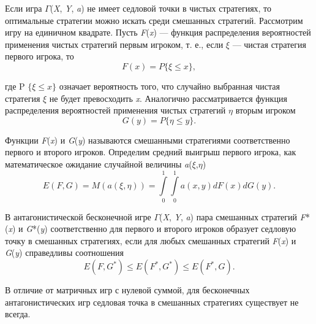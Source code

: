Если игра $\Gamma$(\textit{X}, \textit{Y}, \textit{a}) не имеет седловой точки в чистых стратегиях, то оптимальные стратегии можно искать среди смешанных стратегий. Рассмотрим игру на единичном квадрате. Пусть \textit{F}(\textit{x}) — функция распределения вероятностей применения чистых стратегий первым игроком, т. е., если $\xi$ — чистая стратегия первого игрока, то
\begin{equation}
\label{equation_4_49}
   F(x) = P\{\xi \leqslant x\},
\end{equation}

где P $\{ \xi \leqslant x \}$ означает вероятность того, что случайно выбранная чистая стратегия $\xi$ не будет превосходить \textit{x}. Аналогично рассматривается функция распределения вероятностей применения чистых стратегий $\eta$ вторым игроком
\begin{equation}
\label{equation_4_50}
   G(y)=P\{\eta \leqslant y\}.
\end{equation}

Функции \textit{F}(\textit{x}) и \textit{G}(\textit{y}) называются смешанными стратегиями соответственно первого и второго игроков. Определим средний выигрыш первого игрока, как математическое ожидание  случайной величины \textit{a}($\xi$,$\eta$)
\begin{equation}
\label{equation_4_51}
   E(F, G)=M(a(\xi,\eta))= \int\limits_0^1 \int\limits_0^1 a(x,y)dF(x)dG(y).
\end{equation}

В антагонистической бесконечной игре $\Gamma$(\textit{X}, \textit{Y}, \textit{a}) пара смешанных стратегий \textit{F}*(\textit{x}) и \textit{G}*(\textit{y}) соответственно для первого и второго игроков образует седловую точку в смешанных стратегиях, если для любых смешанных стратегий \textit{F}(\textit{x}) и \textit{G}(\textit{y}) справедливы соотношения
\begin{equation}
\label{equation_4_52}
   E(F, G^*)\leqslant E(F^*, G^*) \leqslant E(F^*, G).
\end{equation}

В отличие от матричных игр с нулевой суммой, для бесконечных антагонистических игр седловая точка в смешанных стратегиях существует не всегда.


